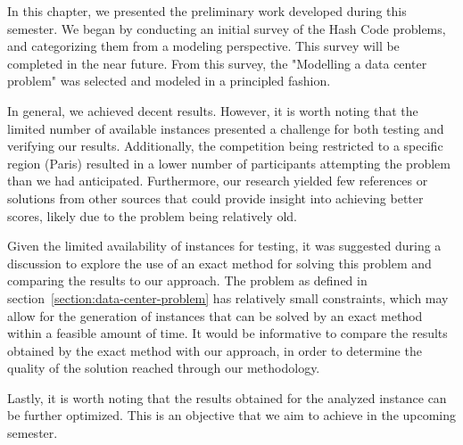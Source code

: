 In this chapter, we presented the preliminary work developed during this
semester. We began by conducting an initial survey of the Hash Code problems,
and categorizing them from a modeling perspective. This survey will be completed
in the near future. From this survey, the "Modelling a data center problem" was
selected and modeled in a principled fashion.

In general, we achieved decent results. However, it is worth noting that the
limited number of available instances presented a challenge for both testing and
verifying our results. Additionally, the competition being restricted to a
specific region (Paris) resulted in a lower number of participants attempting
the problem than we had anticipated. Furthermore, our research yielded few
references or solutions from other sources that could provide insight into
achieving better scores, likely due to the problem being relatively old.

Given the limited availability of instances for testing, it was suggested during
a discussion to explore the use of an exact method for solving this problem and
comparing the results to our approach. The problem as defined in
section~\ref{section:data-center-problem} has relatively small constraints,
which may allow for the generation of instances that can be solved by an exact
method within a feasible amount of time. It would be informative to compare the
results obtained by the exact method with our approach, in order to determine
the quality of the solution reached through our methodology.

Lastly, it is worth noting that the results obtained for the analyzed instance
can be further optimized. This is an objective that we aim to achieve in the
upcoming semester.